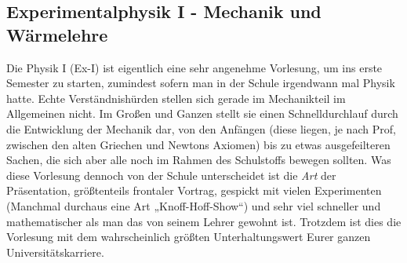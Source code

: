 \subsection{Experimentalphysik I - Mechanik und Wärmelehre}
\label{ex1}

Die Physik I (Ex-I) ist eigentlich eine sehr angenehme Vorlesung, um ins erste Semester zu starten, zumindest sofern man in der Schule irgendwann mal Physik hatte. Echte Verständnishürden stellen sich gerade im Mechanikteil im Allgemeinen nicht. Im Großen und Ganzen stellt sie einen Schnelldurchlauf durch die Entwicklung der Mechanik dar, von den Anfängen (diese liegen, je nach Prof, zwischen den alten Griechen und Newtons Axiomen) bis zu etwas ausgefeilteren Sachen, die sich aber alle noch im Rahmen des Schulstoffs bewegen sollten. Was diese Vorlesung dennoch von der Schule unterscheidet ist die \emph{Art} der Präsentation, größtenteils frontaler Vortrag, gespickt mit vielen Experimenten (Manchmal durchaus eine Art „Knoff-Hoff-Show“) und sehr viel schneller und mathematischer als man das von seinem Lehrer gewohnt ist. Trotzdem ist dies die Vorlesung mit dem wahrscheinlich größten Unterhaltungswert Eurer ganzen Universitätskarriere.

